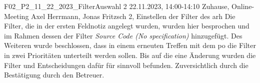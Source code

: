 \fieldnote
{F02\_P2\_11\_22\_2023\_FilterAuswahl}
{2}
{22.11.2023, 14:00-14:10}
{Zuhause, Online-Meeting}
{Axel Herrmann, Jonas Fritzsch}
{2, Einstellen der Filter des \gls{arh}}
{
	Die Filter, die in der ersten Feldnotiz angelegt wurden, wurden hier besprochen und im Rahmen dessen der Filter \emph{Source Code (No specification)} hinzugefügt.
  Des Weiteren wurde beschlossen, dass in einem erneuten Treffen mit dem \gls{po} die Filter in zwei Prioritäten unterteilt werden sollen.
}
{}
{Bis auf die eine Änderung wurden die Filter und Entscheidungen dafür für sinnvoll befunden.}
{}
{Zuversichtlich durch die Bestätigung durch den Betreuer.}
